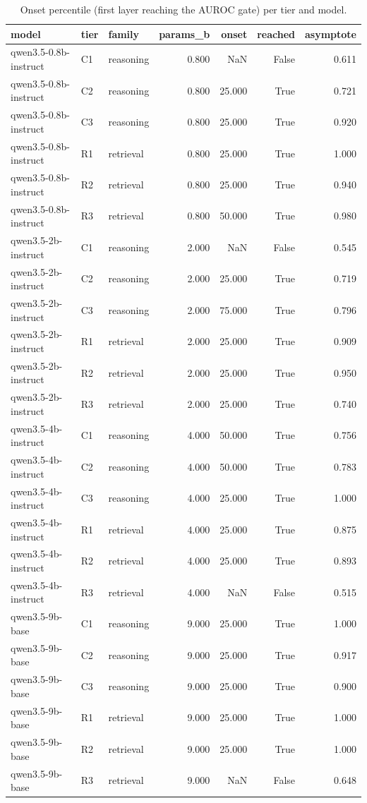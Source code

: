 \begin{table}
\caption{Onset percentile (first layer reaching the AUROC gate) per tier and model.}
\label{tab:t8_h4_depth_onsets}
\begin{tabular}{lllrrrr}
\toprule
model & tier & family & params\_b & onset & reached & asymptote \\
\midrule
qwen3.5-0.8b-instruct & C1 & reasoning & 0.800 & NaN & False & 0.611 \\
qwen3.5-0.8b-instruct & C2 & reasoning & 0.800 & 25.000 & True & 0.721 \\
qwen3.5-0.8b-instruct & C3 & reasoning & 0.800 & 25.000 & True & 0.920 \\
qwen3.5-0.8b-instruct & R1 & retrieval & 0.800 & 25.000 & True & 1.000 \\
qwen3.5-0.8b-instruct & R2 & retrieval & 0.800 & 25.000 & True & 0.940 \\
qwen3.5-0.8b-instruct & R3 & retrieval & 0.800 & 50.000 & True & 0.980 \\
qwen3.5-2b-instruct & C1 & reasoning & 2.000 & NaN & False & 0.545 \\
qwen3.5-2b-instruct & C2 & reasoning & 2.000 & 25.000 & True & 0.719 \\
qwen3.5-2b-instruct & C3 & reasoning & 2.000 & 75.000 & True & 0.796 \\
qwen3.5-2b-instruct & R1 & retrieval & 2.000 & 25.000 & True & 0.909 \\
qwen3.5-2b-instruct & R2 & retrieval & 2.000 & 25.000 & True & 0.950 \\
qwen3.5-2b-instruct & R3 & retrieval & 2.000 & 25.000 & True & 0.740 \\
qwen3.5-4b-instruct & C1 & reasoning & 4.000 & 50.000 & True & 0.756 \\
qwen3.5-4b-instruct & C2 & reasoning & 4.000 & 50.000 & True & 0.783 \\
qwen3.5-4b-instruct & C3 & reasoning & 4.000 & 25.000 & True & 1.000 \\
qwen3.5-4b-instruct & R1 & retrieval & 4.000 & 25.000 & True & 0.875 \\
qwen3.5-4b-instruct & R2 & retrieval & 4.000 & 25.000 & True & 0.893 \\
qwen3.5-4b-instruct & R3 & retrieval & 4.000 & NaN & False & 0.515 \\
qwen3.5-9b-base & C1 & reasoning & 9.000 & 25.000 & True & 1.000 \\
qwen3.5-9b-base & C2 & reasoning & 9.000 & 25.000 & True & 0.917 \\
qwen3.5-9b-base & C3 & reasoning & 9.000 & 25.000 & True & 0.900 \\
qwen3.5-9b-base & R1 & retrieval & 9.000 & 25.000 & True & 1.000 \\
qwen3.5-9b-base & R2 & retrieval & 9.000 & 25.000 & True & 1.000 \\
qwen3.5-9b-base & R3 & retrieval & 9.000 & NaN & False & 0.648 \\
\bottomrule
\end{tabular}
\end{table}

